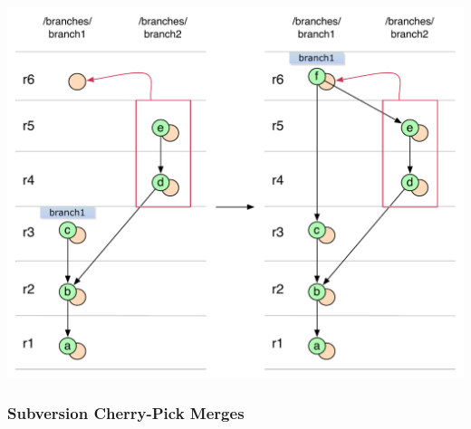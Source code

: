 \begin{center}
\includegraphics[width=\textwidth]{img/diagrams/simple_merge_svn_to_git.pdf}%
\label{simple_merge_svn_to_git}%
\end{center}

\subsubsection{Subversion Cherry-Pick Merges}

